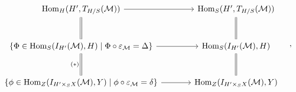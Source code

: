 \[
\begin{tikzcd}[column sep=large,row sep=large]
\operatorname{Hom}_H(H',T_{H/S}(\mathcal M)) \arrow[r] \arrow[d,equal] & \operatorname{Hom}_S(H',T_{H/S}(\mathcal M)) \arrow[d,equal]\\
\{\Phi\in\operatorname{Hom}_S(I_{H'}(\mathcal M),H)\mid\Phi\circ\varepsilon_{\mathcal M}=\Delta\} \arrow[r] \arrow[d,equal,"(*)"'] & \operatorname{Hom}_S(I_{H'}(\mathcal M),H) \arrow[d,equal]\\
\{\phi\in\operatorname{Hom}_Z(I_{H'\times_S X}(\mathcal M),Y)\mid\phi\circ\varepsilon_{\mathcal M}=\delta\} \arrow[r] & \operatorname{Hom}_Z(I_{H'\times_S X}(\mathcal M),Y)
\end{tikzcd}\quad ,
\]

